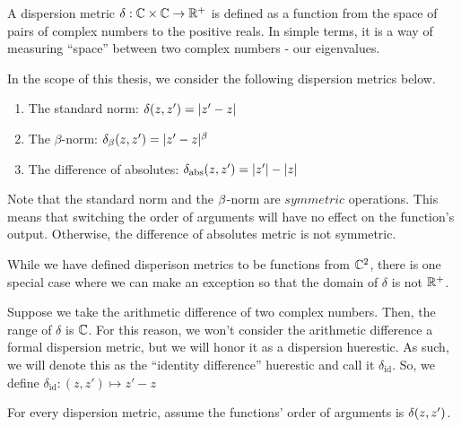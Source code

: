 \begin{definition}
A dispersion metric $\delta: \mathbb{C} \times \mathbb{C} \to \mathbb{R}^+$ is defined as a function from the space of pairs of complex numbers to the positive reals. In simple terms, it is a way of measuring ``space'' between two complex numbers - our eigenvalues.
\end{definition}

\newpage

In the scope of this thesis, we consider the following dispersion metrics below.

\begin{enumerate}
\item The standard norm: $\delta(z,z') = |z' - z|$
\item The $\beta$-norm: $\delta_\beta(z,z') = |z' - z|^\beta$
\item The difference of absolutes: $\delta_{\text{abs}}(z,z') = |z'| - |z|$
\end{enumerate}

\begin{remark}
Note that the standard norm and the $\beta$-norm are $\textit{symmetric}$ operations. This means that switching the order of arguments will have no effect on the function's output. Otherwise, the difference of absolutes metric is not symmetric.
\end{remark}

While we have defined disperison metrics to be functions from $\mathbb{C}^2$, there is one special case where we can make an exception so that the domain of $\delta$ is not $\mathbb{R}^+$.

\begin{remark}
Suppose we take the arithmetic difference of two complex numbers. Then, the range of $\delta$ is $\mathbb{C}$. For this reason, we won't consider the arithmetic difference a formal dispersion metric, but we will honor it as a dispersion huerestic. As such, we will denote this as the ``identity difference'' huerestic and call it $\delta_{\text{id}}$. So, we define $\delta_{\text{id}}: (z, z') \mapsto z' - z$
\end{remark}

For every dispersion metric, assume the functions' order of arguments is $\delta(z, z')$. \newline
\begin{center}
\dispersiontable %
\end{center}
\vspace{1em}


